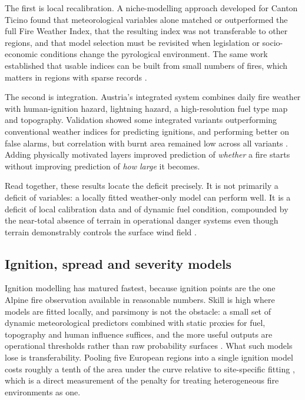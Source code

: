 \documentclass[11pt,a4paper]{article}
\begin{document}
The first is local recalibration. A niche-modelling approach developed for Canton Ticino found that meteorological variables alone matched or outperformed the full Fire Weather Index, that the resulting index was not transferable to other regions, and that model selection must be revisited when legislation or socio-economic conditions change the pyrological environment. The same work established that usable indices can be built from small numbers of fires, which matters in regions with sparse records \citep{de_angelis_modelling_2015}.

The second is integration. Austria's integrated system combines daily fire weather with human-ignition hazard, lightning hazard, a high-resolution fuel type map and topography. Validation showed some integrated variants outperforming conventional weather indices for predicting ignitions, and performing better on false alarms, but correlation with burnt area remained low across all variants \citep{muller_towards_2020}. Adding physically motivated layers improved prediction of \emph{whether} a fire starts without improving prediction of \emph{how large} it becomes.

Read together, these results locate the deficit precisely. It is not primarily a deficit of variables: a locally fitted weather-only model can perform well. It is a deficit of local calibration data and of dynamic fuel condition, compounded by the near-total absence of terrain in operational danger systems even though terrain demonstrably controls the surface wind field \citep{ozaki_impact_2022, sharples_overview_2009}.

\subsection{Ignition, spread and severity models}

Ignition modelling has matured fastest, because ignition points are the one Alpine fire observation available in reasonable numbers. Skill is high where models are fitted locally, and parsimony is not the obstacle: a small set of dynamic meteorological predictors combined with static proxies for fuel, topography and human influence suffices, and the more useful outputs are operational thresholds rather than raw probability surfaces \citep{moreno_1_nodate, vacchiano_modeling_2018, arndt_modeling_2013}. What such models lose is transferability. Pooling five European regions into a single ignition model costs roughly a tenth of the area under the curve relative to site-specific fitting \citep{gelabert_assessing_2025}, which is a direct measurement of the penalty for treating heterogeneous fire environments as one.
\end{document}
